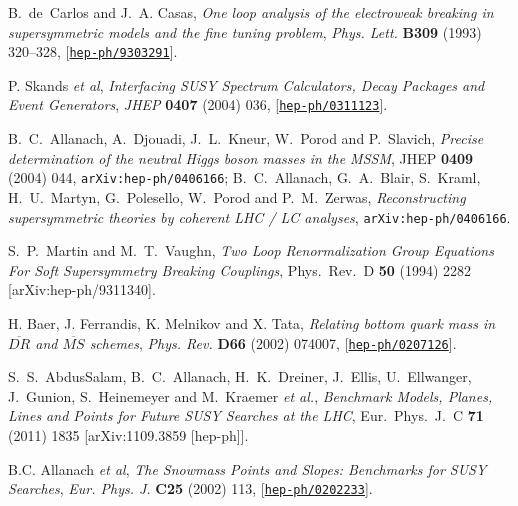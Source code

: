 \documentclass{article}
\def\hepph#1{{\tt arXiv:hep-ph/0406166}}
\begin{document}
\begin{thebibliography}{10}
 B.~de~Carlos and J.~A. Casas, {\it One loop analysis of the electroweak
   breaking in supersymmetric models and the fine tuning problem},  {\em Phys.
   Lett.} {\bf B309} (1993) 320--328,
   [\href{http://xxx.lanl.gov/abs/hep-ph/9303291}{{\tt hep-ph/9303291}}].

P. Skands {\em et al}, {\it Interfacing SUSY Spectrum Calculators, Decay
  Packages and Event Generators}, {\em JHEP} {\bf 0407} (2004) 036,
  [\href{http://xxx.lanl.gov/abs/hep-ph/0311123}{{\tt hep-ph/0311123}}].


B.~C.~Allanach, A.~Djouadi, J.~L.~Kneur, W.~Porod and P.~Slavich,
{\em Precise determination of the neutral Higgs boson masses in the MSSM},   JHEP {\bf 0409} (2004) 044,
\hepph{0406166};
B.~C.~Allanach, G.~A.~Blair, S.~Kraml, H.~U.~Martyn, G.~Polesello, W.~Porod and P.~M.~Zerwas,
{\em Reconstructing supersymmetric theories by coherent LHC / LC analyses},
\hepph{0403133}.

 S.~P.~Martin and M.~T.~Vaughn,
  {\em Two Loop Renormalization Group Equations For Soft Supersymmetry Breaking
  Couplings},
  Phys.\ Rev.\  D {\bf 50} (1994) 2282
  [arXiv:hep-ph/9311340].



H. Baer, J. Ferrandis, K. Melnikov and X. Tata, {\it Relating bottom quark
  mass in $\overline{DR}$ and $\overline{MS}$ schemes},
{\em Phys. Rev.} {\bf D66} (2002) 074007,
  [\href{http://xxx.lanl.gov/abs/hep-ph/0207126}{{\tt hep-ph/0207126}}].

S.~S.~AbdusSalam, B.~C.~Allanach, H.~K.~Dreiner, J.~Ellis, U.~Ellwanger, J.~Gunion, S.~Heinemeyer and M.~Kraemer {\it et al.},
  {\em Benchmark Models, Planes, Lines and Points for Future SUSY Searches at the LHC},
  Eur.\ Phys.\ J.\ C {\bf 71} (2011) 1835
  [arXiv:1109.3859 [hep-ph]].

B.C. Allanach {\em et al}, {\it The Snowmass Points and Slopes: Benchmarks for
  SUSY Searches}, {\em Eur. Phys. J.} {\bf C25} (2002) 113,
 [\href{http://xxx.lanl.gov/abs/hep-ph/0202233}{{\tt hep-ph/0202233}}].



\end{thebibliography}
\end{document}
